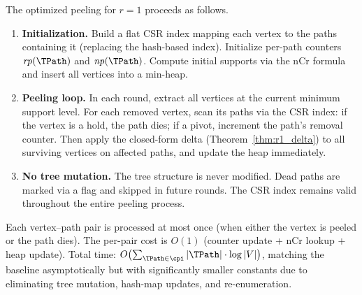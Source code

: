The optimized peeling for $r=1$ proceeds as follows.
\begin{enumerate}[leftmargin=*]
\item \textbf{Initialization.}
Build a flat CSR index mapping each vertex to the paths containing it (replacing the hash-based index).
Initialize per-path counters $\mathit{rp}(\TPath)$ and $\mathit{np}(\TPath)$.
Compute initial supports via the nCr formula and insert all vertices into a min-heap.

\item \textbf{Peeling loop.}
In each round, extract all vertices at the current minimum support level.
For each removed vertex, scan its paths via the CSR index:
if the vertex is a hold, the path dies; if a pivot, increment the path's removal counter.
Then apply the closed-form delta (Theorem~\ref{thm:r1_delta}) to all surviving vertices on affected paths,
and update the heap immediately.

\item \textbf{No tree mutation.}
The tree structure is never modified.
Dead paths are marked via a flag and skipped in future rounds.
The CSR index remains valid throughout the entire peeling process.
\end{enumerate}

Each vertex--path pair is processed at most once (when either the vertex is peeled or the path dies).
The per-pair cost is $O(1)$ (counter update + nCr lookup + heap update).
Total time: $O\bigl(\sum_{\TPath \in \cpi} |\TPath|\cdot \log |V|\bigr)$, matching the baseline asymptotically but with significantly smaller constants due to eliminating tree mutation, hash-map updates, and re-enumeration.


